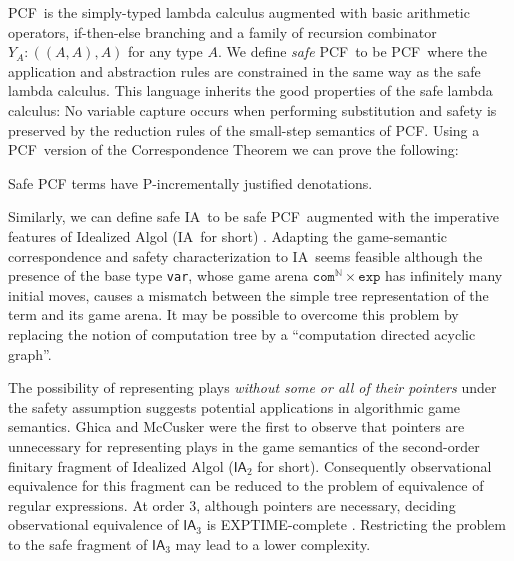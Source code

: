 \documentclass{llncs}
\newcommand\nat{\mathbb{N}}
\newcommand\ialgol{\textsf{IA}}
\newcommand\iacom{\texttt{com}}
\newcommand\iaexp{\texttt{exp}}
\newcommand\iavar{\texttt{var}}
\newcommand\pcf{\textsf{PCF}}
\begin{document}
\pcf\ is the simply-typed lambda calculus augmented with basic
arithmetic operators, if-then-else branching and a family of recursion
combinator $Y_A : ((A,A),A)$ for any type $A$.  We define \emph{safe}
\pcf\ to be \pcf\ where the application and abstraction rules are
constrained in the same way as the safe lambda calculus.  This
language inherits the good properties of the safe lambda calculus: No
variable capture occurs when performing substitution and safety is
preserved by the reduction rules of the small-step semantics of
\pcf. Using a \pcf\ version of the Correspondence Theorem we can prove
the following:
\begin{theorem}
\label{thm:safepcfpincr}
Safe PCF terms have P-incrementally justified denotations.
\end{theorem}

Similarly, we can define safe \ialgol\ to be safe \pcf\ augmented with
the imperative features of Idealized Algol (\ialgol\ for short)
\cite{Reynolds81}.  Adapting the game-semantic correspondence and
safety characterization to \ialgol\ seems feasible although the
presence of the base type \iavar, whose game arena $\iacom^{\nat}
\times \iaexp$ has infinitely many initial moves, causes a mismatch
between the simple tree representation of the term and its game
arena. It may be possible to overcome this problem by replacing the
notion of computation tree by a ``computation directed acyclic
graph''.

The possibility of representing plays \emph{without some or all of
  their pointers} under the safety assumption suggests potential
applications in algorithmic game semantics. Ghica and McCusker
\cite{ghicamccusker00} were the first to observe that pointers are
unnecessary for representing plays in the game semantics of the
second-order finitary fragment of Idealized Algol ($\ialgol_2$ for
short). Consequently observational equivalence for this fragment can
be reduced to the problem of equivalence of regular expressions.  At
order $3$, although pointers are necessary, deciding observational
equivalence of $\ialgol_3$ is EXPTIME-complete
\cite{DBLP:journals/apal/Ong04,DBLP:conf/fossacs/MurawskiW05}. Restricting
the problem to the safe fragment of $\ialgol_3$ may lead to a lower
complexity.


\end{document}
